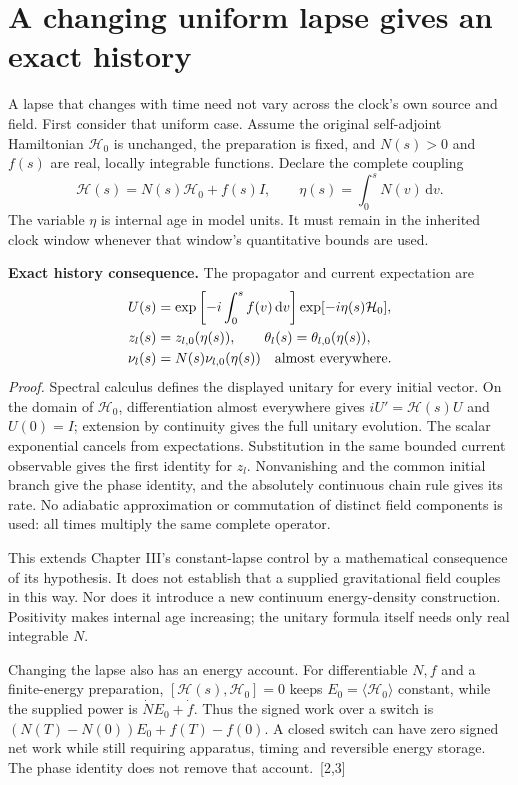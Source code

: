 \documentclass[10pt,twocolumn,letterpaper]{article}
\newcommand{\dd}{\mathrm{d}}
\begin{document}
\section{A changing uniform lapse gives an exact history}
A lapse that changes with time need not vary across the clock's own source and field. First consider that uniform case. Assume the original self-adjoint Hamiltonian $\mathcal H_0$ is unchanged, the preparation is fixed, and $N(s)>0$ and $f(s)$ are real, locally integrable functions. Declare the complete coupling
\[
 \mathcal H(s)=N(s)\mathcal H_0+f(s)I,
 \qquad\eta(s)=\int_0^sN(v)\,\dd v.
\]
The variable $\eta$ is internal age in model units. It must remain in the inherited clock window whenever that window's quantitative bounds are used.

\noindent\textbf{Exact history consequence.} The propagator and current expectation are
\[
\begin{aligned}
 U(s)&=\exp\left[-i\int_0^s f(v)\,\dd v\right]
              \exp[-i\eta(s)\mathcal H_0],\\
 z_l(s)&=z_{l,0}(\eta(s)),\qquad
 \theta_l(s)=\theta_{l,0}(\eta(s)),\\
 \nu_l(s)&=N(s)\nu_{l,0}(\eta(s))
 \quad\hbox{almost everywhere}.
\end{aligned}
\]
\textit{Proof.} Spectral calculus defines the displayed unitary for every initial vector. On the domain of $\mathcal H_0$, differentiation almost everywhere gives $iU'=\mathcal H(s)U$ and $U(0)=I$; extension by continuity gives the full unitary evolution. The scalar exponential cancels from expectations. Substitution in the same bounded current observable gives the first identity for $z_l$. Nonvanishing and the common initial branch give the phase identity, and the absolutely continuous chain rule gives its rate. No adiabatic approximation or commutation of distinct field components is used: all times multiply the same complete operator.

This extends Chapter III's constant-lapse control by a mathematical consequence of its hypothesis. It does not establish that a supplied gravitational field couples in this way. Nor does it introduce a new continuum energy-density construction. Positivity makes internal age increasing; the unitary formula itself needs only real integrable $N$.

Changing the lapse also has an energy account. For differentiable $N,f$ and a finite-energy preparation, $[\mathcal H(s),\mathcal H_0]=0$ keeps $E_0=\langle\mathcal H_0\rangle$ constant, while the supplied power is $\dot N E_0+\dot f$. Thus the signed work over a switch is $(N(T)-N(0))E_0+f(T)-f(0)$. A closed switch can have zero signed net work while still requiring apparatus, timing and reversible energy storage. The phase identity does not remove that account.~[2,3]
\end{document}
